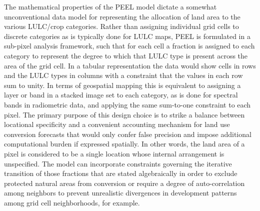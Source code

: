 The mathematical properties of the PEEL model dictate a somewhat
unconventional data model for representing the allocation of land area
to the various LULC\slash crop categories.  Rather than assigning
individual grid cells to discrete categories as is typically done for
LULC maps, PEEL is formulated in a sub-pixel analysis framework, such
that for each cell a fraction is assigned to each category to
represent the degree to which that LULC type is present across the
area of the grid cell.  In a tabular representation the data would
show cells in rows and the LULC types in columns with a constraint
that the values in each row sum to unity.  In terms of geospatial
mapping this is equivalent to assigning a layer or band in a stacked
image set to each category, as is done for spectral bands in
radiometric data, and applying the same sum-to-one constraint to each
pixel.  The primary purpose of this design choice is to strike a
balance between locational specificity and a convenient accounting
mechanism for land use conversion forecasts that would only confer
false precision and impose additional computational burden if
expressed spatially.  In other words, the land area of a pixel is
considered to be a single location whose internal arrangement is
unspecified.  The model can incorporate constraints governing the
iterative transition of those fractions that are stated algebraically
in order to exclude protected natural areas from conversion or require
a degree of auto-correlation among neighbors to prevent unrealistic
divergences in development patterns among grid cell neighborhoods, for
example.

